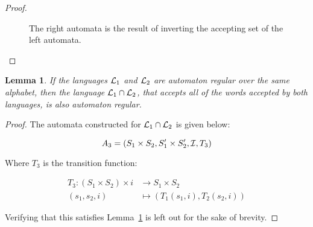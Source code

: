 \documentclass[a4paper]{article}
\newtheorem{lemma}{Lemma}[section]
\theoremstyle{definition}
\theoremstyle{definition}
\theoremstyle{definition}
\begin{document}
\begin{proof}
\begin{figure}[H]
        
        \caption{The right automata is the result of inverting the accepting set of the left automata.}
        \label{fig:automataInvert}
    \end{figure}
    
\end{proof}

\begin{lemma}
    \label{lem:intersectLangsReg}
    If the languages $\mathcal{L}_1$ and $\mathcal{L}_2$ are automaton regular over the same alphabet, then the language $\mathcal{L}_1 \cap \mathcal{L}_2$, that accepts all of the words accepted by both languages, is also \emph{automaton regular}.
\end{lemma}
\begin{proof}
    The automata constructed for $\mathcal{L}_1 \cap \mathcal{L}_2$ is given below:

    \[
    A_3 = (S_1 \times S_2, S_1^\prime \times S_2^\prime, \mathcal{I}, T_3)
    \]
    
    Where $T_3$ is the transition function:
    
    \begin{align*}
        T_3 : (S_1 \times S_2) \times i &\to S_1 \times S_2 \\
            (s_1, s_2, i) &\mapsto (T_1(s_1, i), T_2(s_2, i)) 
    \end{align*}
    
    Verifying that this satisfies Lemma~\ref{lem:intersectLangsReg} is left out for the sake of brevity.
\end{proof}
\end{document}

